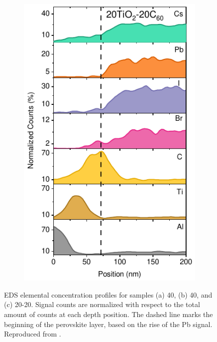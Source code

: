 \begin{figure}[htbp]
\begin{subfigure}{0.32\textwidth}
        \includegraphics[width=\textwidth]{chapters/transport_layers/images/TEM_20_20.pdf}
        \caption{}
        \label{}
    \end{subfigure}
    
    \caption[EDS elemental concentration profiles for samples 40, 40, or 20-20 as the ETL.]{EDS elemental concentration profiles for samples (a) 40, (b) 40, and (c) 20-20. Signal counts are normalized with respect to the total amount of counts at each depth position. The dashed line marks the beginning of the perovskite layer, based on the rise of the Pb signal. Reproduced from \cite{Papadopoulou2025ElectronSpeed}.}
    \label{fig:etl_opt:eds_concentration}
\end{figure}

